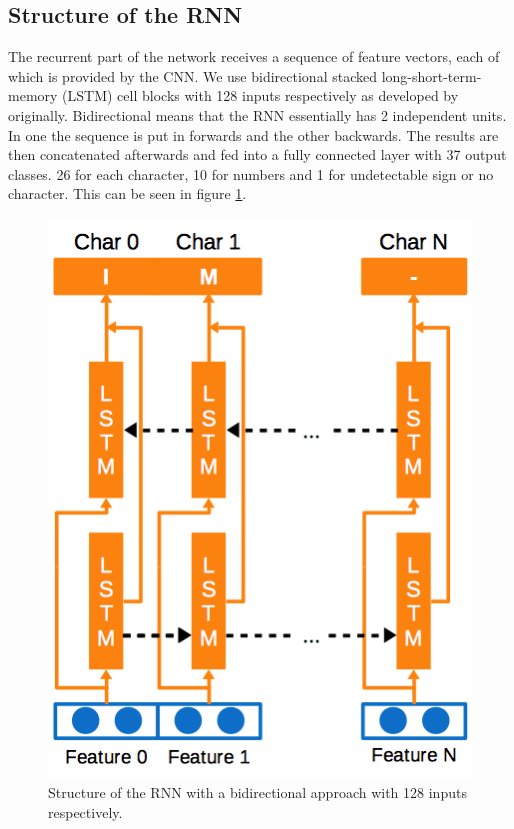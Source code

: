\documentclass{utue} %
\begin{document}
\subsection{Structure of the RNN}
The recurrent part of the network receives a sequence of feature vectors, each of which is provided by the CNN. We use bidirectional stacked long-short-term-memory (LSTM) cell blocks with 128 inputs respectively as developed by ~\cite{Hochreiter:1997:LSM:1246443.1246450} originally. Bidirectional means that the RNN essentially has 2 independent units. In one the sequence is put in forwards and the other backwards. The results are then concatenated afterwards and fed into a fully connected layer with 37 output classes. 26 for each character, 10 for numbers and 1 for undetectable sign or no character. This can be seen in figure \ref{fig:rnn_structure}. \\
\begin{figure}[h!]
	\centering
	\includegraphics[width=.9\columnwidth]{graphics/model_rnn.png}
	\caption{\label{fig:rnn_structure} Structure of the RNN with a bidirectional approach with 128 inputs respectively.}
\end{figure}
\end{document}
